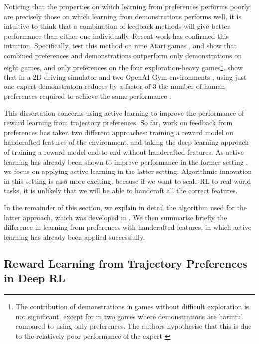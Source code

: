 \documentclass[11pt, a4paper, bibliography=totoc]{report}
\begin{document}
Noticing that the properties on which learning from preferences performs poorly are precisely those on which learning from demonstrations performs well, it is intuitive to think that a combination of feedback methods will give better performance than either one individually. Recent work has confirmed this intuition. Specifically, \cite{Ibarz2018} test this method on nine Atari games \cite{bellemare2013atari}, and show that combined preferences and demonstrations outperform only demonstrations on eight games, and only preferences on the four exploration-heavy games\footnote{The contribution of demonstrations in games without difficult exploration is not significant, except for in two games where demonstrations are harmful compared to using only preferences. The authors hypothesise that this is due to the relatively poor performance of the expert \cite[p.~6]{Ibarz2018}}. \cite{Palan2019} show that in a 2D driving simulator \cite{Byk2017} and two OpenAI Gym environments \cite{brockman2016gym}, using just one expert demonstration reduces by a factor of 3 the number of human preferences required to achieve the same performance \cite[p.~6]{Palan2019}.

This dissertation concerns using active learning to improve the performance of reward learning from trajectory preferences. So far, work on feedback from preferences has taken two different approaches: training a reward model on handcrafted features of the environment, and taking the deep learning approach of training a reward model end-to-end without handcrafted features. As active learning has already been shown to improve performance in the former setting \cite{Byk2017}, we focus on applying active learning in the latter setting. Algorithmic innovation in this setting is also more exciting, because if we want to scale RL to real-world tasks, it is unlikely that we will be able to handcraft all the correct features.

In the remainder of this section, we explain in detail the algorithm used for the latter approach, which was developed in \cite{Christiano2017}. We then summarise briefly the difference in learning from preferences with handcrafted features, in which active learning has already been applied successfully.

\subsection{Reward Learning from Trajectory Preferences in Deep RL}
\end{document}
